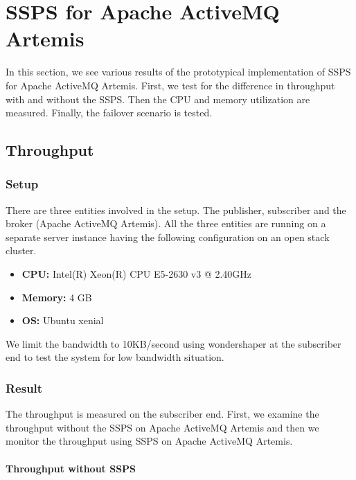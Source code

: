\clearpage

\section{SSPS for Apache ActiveMQ Artemis} \label{artemis}

In this section, we see various results of the prototypical implementation of SSPS for Apache ActiveMQ Artemis. First, we test for the difference in throughput with and without the SSPS. Then the CPU and memory utilization are measured. Finally, the failover scenario is tested.

\subsection{Throughput}
\subsubsection{Setup} \label{subsubsection:throughput_setup}

There are three entities involved in the setup. The publisher, subscriber and the broker (Apache ActiveMQ Artemis). All the three entities are running on a separate server instance having the following configuration on an open stack cluster.

\begin{itemize}
    \item \textbf{CPU:} Intel(R) Xeon(R) CPU E5-2630 v3 @ 2.40GHz
    \item \textbf{Memory:} 4 GB
    \item \textbf{OS:} Ubuntu xenial
\end{itemize}

We limit the bandwidth to 10KB/second using wondershaper \parencite{wondershaper} at the subscriber end to test the system for low bandwidth situation.

\subsubsection{Result}

The throughput is measured on the subscriber end. First, we examine the throughput without the SSPS on Apache ActiveMQ Artemis and then we monitor the throughput using SSPS on Apache ActiveMQ Artemis.

\paragraph{Throughput without SSPS} \mbox{} \\

